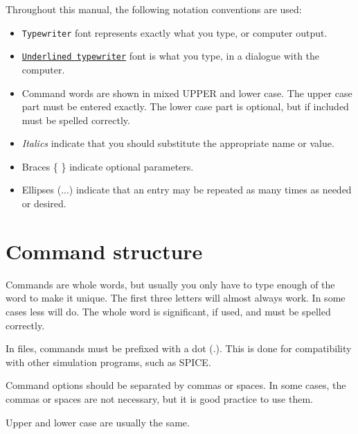Throughout this manual, the following notation conventions are used:

\begin{itemize}
\item {\tt Typewriter} font represents exactly what you type, or computer
output.

\item {\tt \underline{Underlined typewriter}} font is what you type, in a
dialogue with the computer.

\item Command words are shown in mixed UPPER and lower case.  The upper case
part must be entered exactly.  The lower case part is optional, but if
included must be spelled correctly.

\item {\it Italics} indicate that you should substitute the appropriate name
or value.

\item Braces  \{ \}  indicate optional parameters.

\item Ellipses (...) indicate that an entry may be repeated as many times as
needed or desired.

\end{itemize}
\section{Command structure}

Commands are whole words, but usually you only have to type enough of the
word to make it unique.  The first three letters will almost always work.
In some cases less will do.  The whole word is significant, if used, and
must be spelled correctly.

In files, commands must be prefixed with a dot (.).  This is done for
compatibility with other simulation programs, such as SPICE.

Command options should be separated by commas or spaces.  In some cases, the
commas or spaces are not necessary, but it is good practice to use them.

Upper and lower case are usually the same.


